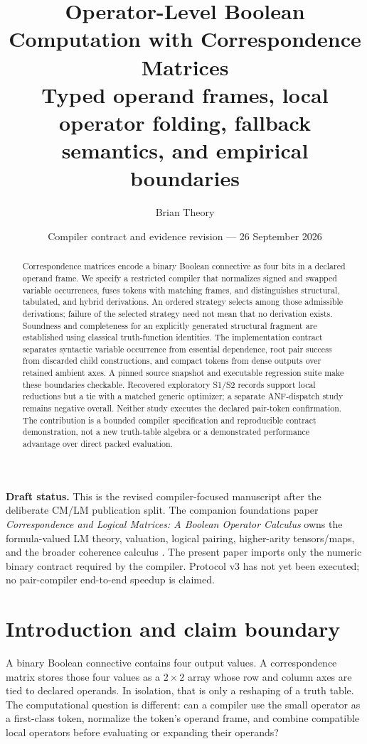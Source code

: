\documentclass[10pt]{article}
\title{\vspace{-1.3em}\textbf{Operator-Level Boolean Computation with Correspondence Matrices}\\[0.35em]
\large Typed operand frames, local operator folding, fallback semantics, and empirical boundaries}
\author{Brian Theory}
\date{Compiler contract and evidence revision --- 26 September 2026}
\theoremstyle{plain}
\theoremstyle{definition}
\theoremstyle{remark}
\begin{document}
\maketitle

\begin{abstract}
Correspondence matrices encode a binary Boolean connective as four bits in a declared operand frame. We specify a restricted compiler that normalizes signed and swapped variable occurrences, fuses tokens with matching frames, and distinguishes structural, tabulated, and hybrid derivations. An ordered strategy selects among those admissible derivations; failure of the selected strategy need not mean that no derivation exists. Soundness and completeness for an explicitly generated structural fragment are established using classical truth-function identities. The implementation contract separates syntactic variable occurrence from essential dependence, root pair success from discarded child constructions, and compact tokens from dense outputs over retained ambient axes. A pinned source snapshot and executable regression suite make these boundaries checkable. Recovered exploratory S1/S2 records support local reductions but a tie with a matched generic optimizer; a separate ANF-dispatch study remains negative overall. Neither study executes the declared pair-token confirmation. The contribution is a bounded compiler specification and reproducible contract demonstration, not a new truth-table algebra or a demonstrated performance advantage over direct packed evaluation.

\end{abstract}

\noindent\textbf{Draft status.} This is the revised compiler-focused manuscript after the deliberate CM/LM publication split. The companion foundations paper \emph{Correspondence and Logical Matrices: A Boolean Operator Calculus} owns the formula-valued LM theory, valuation, logical pairing, higher-arity tensors/maps, and the broader coherence calculus \cite{TheoryFoundations2026}. The present paper imports only the numeric binary contract required by the compiler. Protocol v3 has not yet been executed; no pair-compiler end-to-end speedup is claimed.

\section{Introduction and claim boundary}

A binary Boolean connective contains four output values. A correspondence matrix stores those four values as a $2\times2$ array whose row and column axes are tied to declared operands. In isolation, that is only a reshaping of a truth table. The computational question is different: can a compiler use the small operator as a first-class token, normalize the token's operand frame, and combine compatible local operators before evaluating or expanding their operands?
\end{document}
